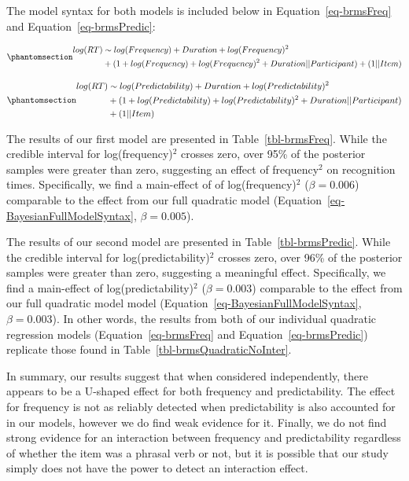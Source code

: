 \documentclass[
  12pt,
  letterpaper,
]{scrreprt}
\begin{document}
The model syntax for both models is included below in
Equation~\ref{eq-brmsFreq} and Equation~\ref{eq-brmsPredic}:

\begin{equation}\phantomsection\label{eq-brmsFreq}{
\begin{aligned}
log(RT) & \sim log(Frequency) + Duration + log(Frequency)^2 \\ & + (1 + log(Frequency) + log(Frequency)^2 + Duration || Participant) + (1 || Item)
\end{aligned}
}\end{equation}

\begin{equation}\phantomsection\label{eq-brmsPredic}{
\begin{aligned}
log(RT) & \sim log(Predictability) + Duration + log(Predictability)^2 \\ & + (1 + log(Predictability) + log(Predictability)^2 + Duration || Participant) \\ & + (1 || Item)
\end{aligned}
}\end{equation}

The results of our first model are presented in
Table~\ref{tbl-brmsFreq}. While the credible interval for
log(frequency)\(^2\) crosses zero, over 95\% of the posterior samples
were greater than zero, suggesting an effect of frequency\(^2\) on
recognition times. Specifically, we find a main-effect of of
log(frequency)\(^2\) (\(\beta = 0.006\)) comparable to the effect from
our full quadratic model (Equation~\ref{eq-BayesianFullModelSyntax},
\(\beta = 0.005\)).

The results of our second model are presented in
Table~\ref{tbl-brmsPredic}. While the credible interval for
log(predictability)\(^2\) crosses zero, over 96\% of the posterior
samples were greater than zero, suggesting a meaningful effect.
Specifically, we find a main-effect of log(predictability)\(^2\)
(\(\beta=0.003\)) comparable to the effect from our full quadratic model
model (Equation~\ref{eq-BayesianFullModelSyntax}, \(\beta=0.003\)). In
other words, the results from both of our individual quadratic
regression models (Equation~\ref{eq-brmsFreq} and
Equation~\ref{eq-brmsPredic}) replicate those found in
Table~\ref{tbl-brmsQuadraticNoInter}.

In summary, our results suggest that when considered independently,
there appears to be a U-shaped effect for both frequency and
predictability. The effect for frequency is not as reliably detected
when predictability is also accounted for in our models, however we do
find weak evidence for it. Finally, we do not find strong evidence for
an interaction between frequency and predictability regardless of
whether the item was a phrasal verb or not, but it is possible that our
study simply does not have the power to detect an interaction effect.
\end{document}
